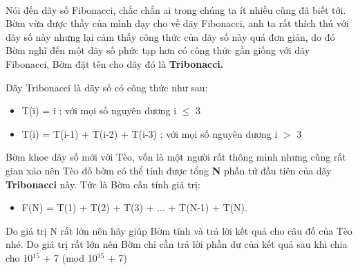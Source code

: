  

Nói đến dãy số Fibonacci, chắc chắn ai trong chúng ta ít nhiều cũng đã biết tới. Bờm vừa được thầy của mình dạy cho về dãy Fibonacci, anh ta rất thích thú với dãy số này nhưng lại cảm thấy công thức của dãy số này quá đơn giản, do đó Bờm nghĩ đến một dãy số phức tạp hơn có công thức gần giống với dãy Fibonacci, Bờm đặt tên cho dãy đó là \textbf{ Tribonacci. }

Dãy Tribonacci là dãy số có công thức như sau:
\begin{itemize}
	\item T(i) = i ; với mọi số nguyên dương i  $\le$  3
	\item T(i) = T(i-1) + T(i-2) + T(i-3) ; với mọi số nguyên dương i $>$ 3
\end{itemize}

Bờm khoe dãy số mới với Tèo, vốn là một người rất thông minh nhưng cũng rất gian xảo nên Tèo đố bờm có thể tính được tổng \textbf{ N } phần tử đầu tiên của dãy \textbf{ Tribonacci } này. Tức là Bờm cần tính giá trị:
\begin{itemize}
	\item F(N) = T(1) + T(2) + T(3) + ... + T(N-1) + T(N).
\end{itemize}

Do giá trị N rất lớn nên hãy giúp Bờm tính và trả lời kết quả cho câu đố của Tèo nhé. Do giá trị rất lớn nên Bờm chỉ cần trả lời phần dư của kết quả sau khi chia cho 10$^15 $ + 7 (mod 10$^15 $ + 7)